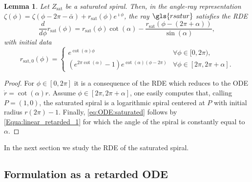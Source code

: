 \documentclass[reqno]{amsart}
\theoremstyle{definition} \newtheorem{definition}{Definition}[section]
\theoremstyle{definition} \newtheorem{remark}[definition]{Remark}
\theoremstyle{plain} \newtheorem{lemma}[definition]{Lemma}
\theoremstyle{plain} \newtheorem{proposition}[definition]{Proposition}
\theoremstyle{plain} \newtheorem{theorem}[definition]{Theorem}
\theoremstyle{plain} \newtheorem{corollary}[definition]{Corollary}
\theoremstyle{definition} \newtheorem{example}[definition]{Example}
\theoremstyle{plain} \newtheorem{claim}[clai]{Claim}
\theoremstyle{definition} \newtheorem{assumption}[definition]{Assumption}
\theoremstyle{definition} \newtheorem{observation}[definition]{Observation}
\newcommand{\1}{\mathbbm 1}
\renewcommand{\i}{\imath}
\numberwithin{equation}{section} %
\theoremstyle{plain} \newtheorem*{theorem*}{Theorem}
\theoremstyle{plain} \newtheorem{mthm}[maintheorem]{Main Theorem}
\theoremstyle{plain} \newtheorem*{mthm*}{Main Theorem}
\theoremstyle{plain} \newtheorem*{conjecture*}{Conjecture}
\theoremstyle{plain} \newtheorem{conjecture}[definition]{Conjecture}
\theoremstyle{plain} \newtheorem*{problem*}{Problem}
\begin{document}
\begin{lemma}
\label{lem:initial:data:saturated}
Let $Z_\mathrm{sat}$ be a saturated spiral. Then, in the angle-ray representation $\zeta(\phi) = \zeta(\phi - 2\pi - \bar \alpha) + r_\mathrm{sat}(\phi) e^{\i \phi}$, the ray  $\gls{rsatur}$ satisfies the RDE
\begin{equation}
\label{eq:ODE:saturated}
\frac{d}{d\phi} r_\mathrm{sat}(\phi) = r_\mathrm{sat}(\phi) \cot(\alpha) - \frac{r_\mathrm{sat}(\phi - (2\pi + \alpha))}{\sin(\alpha)},
\end{equation}
with initial data
\begin{equation*}
r_{\mathrm{sat},0}(\phi) = \begin{cases}
e^{\cot(\alpha) \phi} & \forall \phi \in [0,2 \pi), \\
(e^{2 \pi \cot(\alpha)} - 1) e^{\cot(\alpha) (\phi - 2 \pi)} & \forall \phi \in [2\pi,2\pi+\alpha].
\end{cases}
\end{equation*}
\end{lemma}


\begin{proof}
For $\phi\in[0,2\pi]$ it is a consequence of the RDE which reduces to the ODE $\dot r = \cot(\alpha) r$. Assume $\phi \in [2\pi,2\pi + \alpha]$, one easily computes that, calling $P=(1,0)$, the saturated spiral is a logarithmic spiral centered at $P$ with initial radius $r(2\pi)-1$. Finally, \eqref{eq:ODE:saturated} follows by \eqref{Equa:linear_retarded_1} for which the angle of the spiral is constantly equal to $\alpha$.
\end{proof}


In the next section we study the RDE of the saturated spiral.


\subsection{Formulation as a retarded ODE}
\label{ss:dde}
\end{document}

